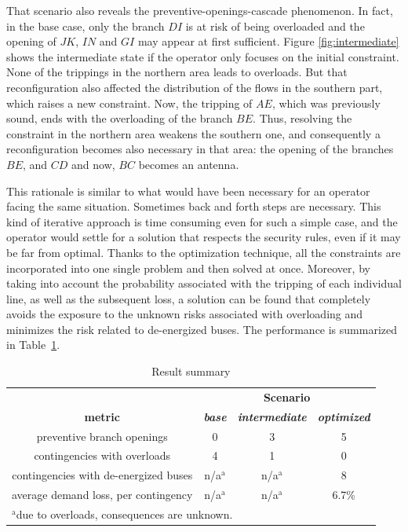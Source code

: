 That scenario also reveals the preventive-openings-cascade phenomenon. In fact, in the
base case, only the branch $DI$ is at risk of being overloaded and the opening of
$JK$, $IN$ and $GI$ may appear at first sufficient. Figure
\ref{fig:intermediate} shows the intermediate state if the operator only focuses
on the initial constraint. None of the trippings in the northern area leads to overloads.
But that reconfiguration also affected the distribution of the flows in the
southern part, which raises a new constraint. Now, the tripping of $AE$, which
was previously sound, ends with the overloading of the branch $BE$. Thus, resolving
the constraint in the northern area weakens the southern one, and consequently a
reconfiguration becomes also necessary in that area: the opening of the branches
$BE$, and $CD$ and now, $BC$ becomes an antenna.

This rationale is similar to what would have been necessary for an operator facing
the same situation. Sometimes back and forth steps are necessary. This kind of iterative
approach is time consuming even for such a simple case, and the operator would
settle for a solution that respects the security rules, even if it may be far from
optimal. Thanks to the optimization technique, all the constraints are incorporated
into one single problem and then solved at once. Moreover, by taking into account
the probability associated with the tripping of each individual line, as well as
the subsequent loss, a solution can be found that completely avoids the exposure to the unknown risks associated with overloading and minimizes the risk related to de-energized buses. 
The performance is summarized in Table~\ref{tab1}.


\begin{table}[htbp]
\caption{Result summary}
\begin{center}
\begin{tabular}{|c|c|c|c|}
\hline
\textbf{}&\multicolumn{3}{|c|}{\textbf{Scenario}} \\
\cline{2-4} 
\textbf{metric} & \textbf{\textit{base}}& \textbf{\textit{intermediate}}& \textbf{\textit{optimized}} \\
\hline
preventive branch openings & 0 & 3 & 5 \\
    contingencies with overloads & 4 & 1 & 0\\
     contingencies with de-energized buses & n/a$^{\mathrm{a}}$ & n/a$^{\mathrm{a}}$ & 8 \\
     average demand loss, per contingency & n/a$^{\mathrm{a}}$ & n/a$^{\mathrm{a}}$ & 6.7\% \\
\hline
\multicolumn{4}{l}{$^{\mathrm{a}}$due to overloads, consequences are unknown.}
\end{tabular}
\label{tab1}
\end{center}
\end{table}
